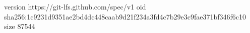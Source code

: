 version https://git-lfs.github.com/spec/v1
oid sha256:1c9231d9351ae2bd4dc448caab9d21f234a3fd4c7b29e3c9fae371bf346f6c10
size 87544
